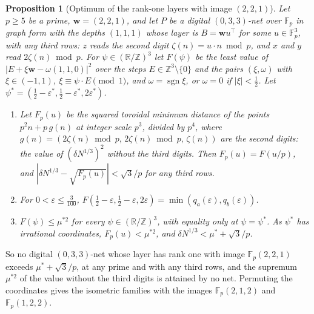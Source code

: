 \documentclass[11pt]{amsart}
\newtheorem{proposition}[theorem]{Proposition}
\theoremstyle{definition}
\theoremstyle{plain}
\newcommand{\Z}{\mathbb{Z}}
\newcommand{\F}{\mathbb{F}}
\DeclareMathOperator{\sgn}{sgn}
\providecommand{\R}{\mathbb{R}}
\begin{document}
\begin{proposition}[Optimum of the rank-one layers with image $(2,2,1)$]\label{prop:wfamily}
Let $p\ge5$ be a prime, $\mathbf w=(2,2,1)$, and let $P$ be a digital $(0,3,3)$-net over $\F_p$ in graph form with the depths $(1,1,1)$ whose layer is $B=\mathbf w u^{\!\top}$ for some $u\in\F_p^3$, with any third rows: $z$ reads the second digit $\zeta(n)=u\cdot n\bmod p$, and $x$ and $y$ read $2\zeta(n)\bmod p$. For $\psi\in(\R/\Z)^3$ let $F(\psi)$ be the least value of $|E+\xi\mathbf w-\omega(1,1,0)|^2$ over the steps $E\in\Z^3\setminus\{0\}$ and the pairs $(\xi,\omega)$ with $\xi\in(-1,1)$, $\xi\equiv\psi\cdot E\pmod1$, and $\omega=\sgn\xi$, or $\omega=0$ if $|\xi|<\frac12$. Let $\psi^*=(\frac12-\varepsilon^*,\frac12-\varepsilon^*,2\varepsilon^*)$.
\begin{enumerate}
\item Let $F_p(u)$ be the squared toroidal minimum distance of the points $p^2n+p\,g(n)$ at integer scale $p^3$, divided by $p^4$, where $g(n)=(2\zeta(n)\bmod p,\,2\zeta(n)\bmod p,\,\zeta(n))$ are the second digits: the value of $(\delta N^{1/3})^2$ without the third digits. Then $F_p(u)=F(u/p)$, and $|\delta N^{1/3}-\sqrt{F_p(u)}|<\sqrt3/p$ for any third rows.
\item For $0<\varepsilon\le\frac3{100}$, $F(\frac12-\varepsilon,\frac12-\varepsilon,2\varepsilon)=\min(q_a(\varepsilon),q_b(\varepsilon))$.
\item $F(\psi)\le\mu^{*2}$ for every $\psi\in(\R/\Z)^3$, with equality only at $\psi=\psi^*$. As $\psi^*$ has irrational coordinates, $F_p(u)<\mu^{*2}$, and $\delta N^{1/3}<\mu^*+\sqrt3/p$.
\end{enumerate}
\end{proposition}

So no digital $(0,3,3)$-net whose layer has rank one with image $\F_p(2,2,1)$ exceeds $\mu^*+\sqrt3/p$, at any prime and with any third rows, and the supremum $\mu^{*2}$ of the value without the third digits is attained by no net. Permuting the coordinates gives the isometric families with the images $\F_p(2,1,2)$ and $\F_p(1,2,2)$.
\end{document}
